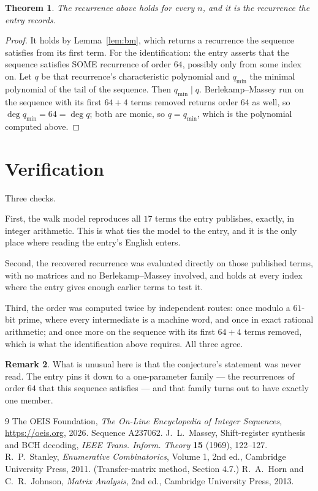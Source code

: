\documentclass[11pt,a4paper]{article}
\theoremstyle{plain}
\newtheorem{theorem}{Theorem}
\theoremstyle{definition}
\newtheorem{remark}[theorem]{Remark}
\begin{document}
\begin{theorem}
The recurrence above holds for every $n$, and it is the recurrence the entry records.
\end{theorem}

\begin{proof}
It holds by Lemma~\ref{lem:bm}, which returns a recurrence the sequence satisfies from its
first term. For the identification: the entry asserts that the sequence satisfies SOME
recurrence of order $64$, possibly only from some index on. Let $q$ be that recurrence's
characteristic polynomial and $q_{\min}$ the minimal polynomial of the tail of the sequence.
Then $q_{\min}\mid q$. Berlekamp--Massey run on the sequence with its first $64+4$ terms
removed returns order $64$ as well, so $\deg q_{\min}=64=\deg q$; both are monic, so
$q=q_{\min}$, which is the polynomial computed above.
\end{proof}

\section{Verification}

Three checks.

First, the walk model reproduces all $17$ terms the entry publishes, exactly, in integer
arithmetic. This is what ties the model to the entry, and it is the only place where reading
the entry's English enters.

Second, the recovered recurrence was evaluated directly on those published terms, with no
matrices and no Berlekamp--Massey involved, and holds at every index where the entry gives
enough earlier terms to test it.

Third, the order was computed twice by independent routes: once modulo a $61$-bit prime, where
every intermediate is a machine word, and once in exact rational arithmetic; and once more on
the sequence with its first $64+4$ terms removed, which is what the identification above
requires. All three agree.

\begin{remark}
What is unusual here is that the conjecture's statement was never read. The entry pins it down
to a one-parameter family --- the recurrences of order $64$ that this sequence satisfies
--- and that family turns out to have exactly one member.
\end{remark}

\begin{thebibliography}{9}
 The OEIS Foundation, \emph{The On-Line Encyclopedia of Integer
Sequences}, \url{https://oeis.org}, 2026. Sequence A237062.
 J.~L.~Massey, Shift-register synthesis and BCH decoding, \emph{IEEE
Trans. Inform. Theory} \textbf{15} (1969), 122--127.
 R.~P.~Stanley, \emph{Enumerative Combinatorics}, Volume 1, 2nd ed.,
Cambridge University Press, 2011. (Transfer-matrix method, Section 4.7.)
 R.~A.~Horn and C.~R.~Johnson, \emph{Matrix Analysis}, 2nd ed., Cambridge
University Press, 2013.
\end{thebibliography}
\end{document}
